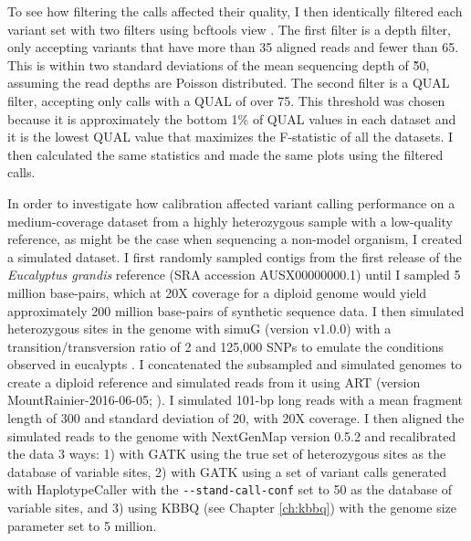 To see how filtering the calls affected their quality, I then identically filtered each variant set with two filters using bcftools view \parencite{li_sequence_2009}. The first filter is a depth filter, only accepting variants that have more than 35 aligned reads and fewer than 65. This is within two standard deviations of the mean sequencing depth of \~50, assuming the read depths are Poisson distributed. The second filter is a QUAL filter, accepting only calls with a QUAL of over 75. This threshold was chosen because it is approximately the bottom 1\% of QUAL values in each dataset and it is the lowest QUAL value that maximizes the F-statistic of all the datasets. I then calculated the same statistics and made the same plots using the filtered calls.



%
In order to investigate how calibration affected variant calling performance on a medium-coverage dataset from a highly heterozygous sample with a low-quality reference, as might be the case when sequencing a non-model organism, I created a simulated dataset. I first randomly sampled contigs from the first release of the \textit{Eucalyptus grandis} reference (SRA accession AUSX00000000.1) until I sampled 5 million base-pairs, which at 20X coverage for a diploid genome would yield approximately 200 million base-pairs of synthetic sequence data. I then simulated heterozygous sites in the genome with simuG (version v1.0.0) \parencite{yue_simug_2019} with a transition/transversion ratio of 2 and 125,000 SNPs to emulate the conditions observed in eucalypts \parencite{kulheim_comparative_2009}. I concatenated the subsampled and simulated genomes to create a diploid reference and simulated reads from it using ART (version MountRainier-2016-06-05; \cite{huang_art_2012}). I simulated 101-bp long reads with a mean fragment length of 300 and standard deviation of 20, with 20X coverage. I then aligned the simulated reads to the genome with NextGenMap version 0.5.2 \parencite{sedlazeck_nextgenmap_2013} and recalibrated the data 3 ways: 1) with GATK using the true set of heterozygous sites as the database of variable sites, 2) with GATK using a set of variant calls generated with HaplotypeCaller with the \texttt{-\phantom{}-stand-call-conf} set to 50 as the database of variable sites, and 3) using KBBQ (see Chapter \ref{ch:kbbq}) with the genome size parameter set to 5 million.

